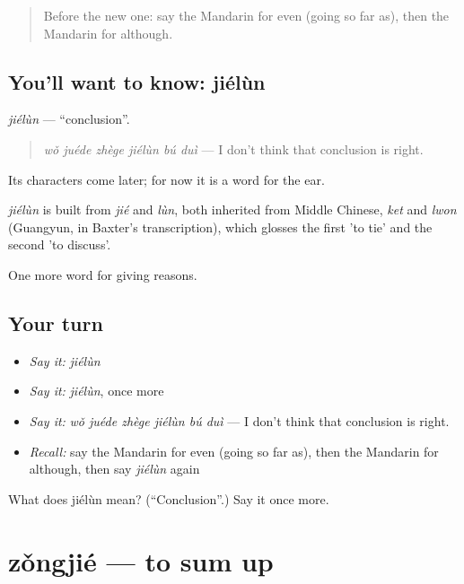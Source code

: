 \begin{quote}
Before the new one: say the Mandarin for even (going so far as), then the Mandarin for although.
\end{quote}

\subsection*{You'll want to know: jiélùn}
\emph{jiélùn} — \textquotedblleft{}conclusion\textquotedblright{}.

\begin{quote}
\emph{wǒ juéde zhège jiélùn bú duì} — I don't think that conclusion is right.
\end{quote}

Its characters come later; for now it is a word for the ear.

\begin{cousinweb}
\emph{jiélùn} is built from \emph{jié} and \emph{lùn}, both inherited from Middle Chinese, \emph{ket} and \emph{lwon} (Guangyun, in Baxter's transcription), which glosses the first 'to tie' and the second 'to discuss'.
\end{cousinweb}

\begin{grammarlens}[title={What you've built}]
One more word for giving reasons.
\end{grammarlens}

\subsection*{Your turn}
\begin{itemize}
\raggedright
  \item \emph{Say it:} \emph{jiélùn}
  \item \emph{Say it:} \emph{jiélùn}, once more
  \item \emph{Say it:} \emph{wǒ juéde zhège jiélùn bú duì} — I don't think that conclusion is right.
  \item \emph{Recall:} say the Mandarin for even (going so far as), then the Mandarin for although, then say \emph{jiélùn} again
\end{itemize}

\begin{tcolorbox}[breakable,colback=teal!4,colframe=teal!35!black,title={Before you move on}]
What does jiélùn mean? (\textquotedblleft{}Conclusion\textquotedblright{}.) Say it once more.
\end{tcolorbox}
\section[zǒngjié]{zǒngjié — to sum up}

